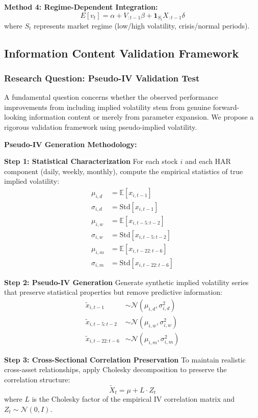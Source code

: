 \documentclass[12pt,a4paper]{article}
\begin{document}
\textbf{Method 4: Regime-Dependent Integration:}
$$E[v_t] = \alpha + V_{:t-1}\beta + \mathbf{1}_{S_t} X_{:t-1}\delta$$
where $S_t$ represents market regime (low/high volatility, crisis/normal periods).

\subsection{Information Content Validation Framework}

\subsubsection{Research Question: Pseudo-IV Validation Test}

A fundamental question concerns whether the observed performance improvements from including implied volatility stem from genuine forward-looking information content or merely from parameter expansion. We propose a rigorous validation framework using pseudo-implied volatility.

\textbf{Pseudo-IV Generation Methodology:}

\textbf{Step 1: Statistical Characterization}
For each stock $i$ and each HAR component (daily, weekly, monthly), compute the empirical statistics of true implied volatility:
\begin{align}
\mu_{i,d} &= \mathbb{E}[x_{i,t-1}] \\
\sigma_{i,d} &= \text{Std}[x_{i,t-1}] \\
\mu_{i,w} &= \mathbb{E}[x_{i,t-5:t-2}] \\
\sigma_{i,w} &= \text{Std}[x_{i,t-5:t-2}] \\
\mu_{i,m} &= \mathbb{E}[x_{i,t-22:t-6}] \\
\sigma_{i,m} &= \text{Std}[x_{i,t-22:t-6}]
\end{align}

\textbf{Step 2: Pseudo-IV Generation}
Generate synthetic implied volatility series that preserve statistical properties but remove predictive information:
\begin{align}
\tilde{x}_{i,t-1} &\sim \mathcal{N}(\mu_{i,d}, \sigma_{i,d}^2) \\
\tilde{x}_{i,t-5:t-2} &\sim \mathcal{N}(\mu_{i,w}, \sigma_{i,w}^2) \\
\tilde{x}_{i,t-22:t-6} &\sim \mathcal{N}(\mu_{i,m}, \sigma_{i,m}^2)
\end{align}

\textbf{Step 3: Cross-Sectional Correlation Preservation}
To maintain realistic cross-asset relationships, apply Cholesky decomposition to preserve the correlation structure:
$$\tilde{X}_t = \mu + L \cdot Z_t$$
where $L$ is the Cholesky factor of the empirical IV correlation matrix and $Z_t \sim \mathcal{N}(0,I)$.
\end{document}
